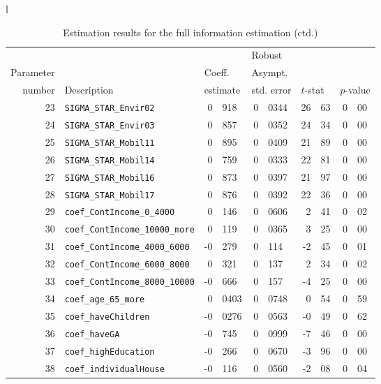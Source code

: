 \documentclass[12pt,a4paper]{article}
\begin{document}
 \begin{table}[htb]
\caption{\label{tab:fi-2}Estimation results for the full information
  estimation (ctd.)}

  \begin{tabular}{l}
\begin{tabular}{rlr@{.}lr@{.}lr@{.}lr@{.}l}
         &                       &   \multicolumn{2}{l}{}    & \multicolumn{2}{l}{Robust}  &     \multicolumn{4}{l}{}   \\
Parameter &                       &   \multicolumn{2}{l}{Coeff.}      & \multicolumn{2}{l}{Asympt.}  &     \multicolumn{4}{l}{}   \\
number &  Description                     &   \multicolumn{2}{l}{estimate}      & \multicolumn{2}{l}{std. error}  &   \multicolumn{2}{l}{$t$-stat}  &   \multicolumn{2}{l}{$p$-value}   \\
\hline
23 & \lstinline$SIGMA_STAR_Envir02$ & 0&918 & 0&0344 & 26&63 & 0&00\\
24 & \lstinline$SIGMA_STAR_Envir03$ & 0&857 & 0&0352 & 24&34 & 0&00\\
25 & \lstinline$SIGMA_STAR_Mobil11$ & 0&895 & 0&0409 & 21&89 & 0&00\\
26 & \lstinline$SIGMA_STAR_Mobil14$ & 0&759 & 0&0333 & 22&81 & 0&00\\
27 & \lstinline$SIGMA_STAR_Mobil16$ & 0&873 & 0&0397 & 21&97 & 0&00\\
28 & \lstinline$SIGMA_STAR_Mobil17$ & 0&876 & 0&0392 & 22&36 & 0&00\\
29 & \lstinline$coef_ContIncome_0_4000$ & 0&146 & 0&0606 & 2&41 & 0&02\\
30 & \lstinline$coef_ContIncome_10000_more$ & 0&119 & 0&0365 & 3&25 & 0&00\\
31 & \lstinline$coef_ContIncome_4000_6000$ & -0&279 & 0&114 & -2&45 & 0&01\\
32 & \lstinline$coef_ContIncome_6000_8000$ & 0&321 & 0&137 & 2&34 & 0&02\\
33 & \lstinline$coef_ContIncome_8000_10000$ & -0&666 & 0&157 & -4&25 & 0&00\\
34 & \lstinline$coef_age_65_more$ & 0&0403 & 0&0748 & 0&54 & 0&59\\
35 & \lstinline$coef_haveChildren$ & -0&0276 & 0&0563 & -0&49 & 0&62\\
36 & \lstinline$coef_haveGA$ & -0&745 & 0&0999 & -7&46 & 0&00\\
37 & \lstinline$coef_highEducation$ & -0&266 & 0&0670 & -3&96 & 0&00\\
38 & \lstinline$coef_individualHouse$ & -0&116 & 0&0560 & -2&08 & 0&04\\

\end{tabular}
\end{tabular}
\end{table}
\end{document}
